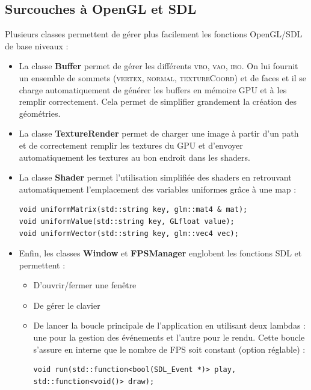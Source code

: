 \documentclass[11pt,a4paper]{article}
\begin{document}
\subsection{Surcouches à OpenGL et SDL}
Plusieurs classes permettent de gérer plus facilement les fonctions OpenGL/SDL de base niveaux :\\
\begin{itemize}
\item La classe \textbf{Buffer} permet de gérer les différents \textsc{vbo}, \textsc{vao}, \textsc{ibo}.
On lui fournit un ensemble de sommets (\textsc{vertex}, \textsc{normal}, \textsc{textureCoord}) et de faces et il se charge automatiquement de générer les buffers en mémoire GPU
et à les remplir correctement. Cela permet de simplifier grandement la création des géométries.\\
\item La classe \textbf{TextureRender} permet de charger une image à partir d'un path et de correctement remplir les
textures du GPU et d'envoyer automatiquement les textures au bon endroit dans les shaders.\\
\item La classe \textbf{Shader} permet l'utilisation simplifiée des shaders en retrouvant automatiquement l'emplacement 
des variables uniformes grâce à une map :
\begin{lstlisting}
void uniformMatrix(std::string key, glm::mat4 & mat);
void uniformValue(std::string key, GLfloat value);
void uniformVector(std::string key, glm::vec4 vec);
\end{lstlisting}

\item Enfin, les classes \textbf{Window} et \textbf{FPSManager} englobent les fonctions SDL et permettent :
	\begin{itemize}
	\item D'ouvrir/fermer une fenêtre
	\item De gérer le clavier
	\item De lancer la boucle principale de l'application en utilisant deux lambdas : une pour la gestion des événements
	et l'autre pour le rendu. Cette boucle s'assure en interne que le nombre de FPS soit constant (option réglable) :
	\begin{lstlisting}
void run(std::function<bool(SDL_Event *)> play, std::function<void()> draw);
	\end{lstlisting}
	\end{itemize}
\end{itemize}
\end{document}
